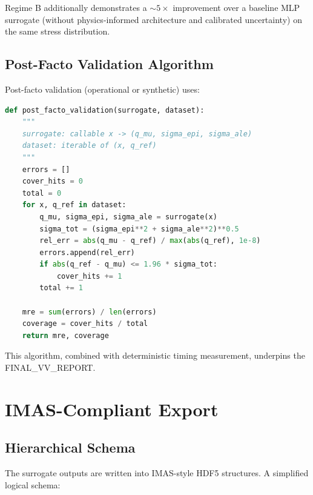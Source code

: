 \documentclass[11pt]{article}
\begin{document}
Regime B additionally demonstrates a $\sim 5\times$ improvement over a baseline MLP surrogate (without physics-informed architecture and calibrated uncertainty) on the same stress distribution.

\subsection{Post-Facto Validation Algorithm}

Post-facto validation (operational or synthetic) uses:

\begin{lstlisting}[style=code,language=Python]
def post_facto_validation(surrogate, dataset):
    """
    surrogate: callable x -> (q_mu, sigma_epi, sigma_ale)
    dataset: iterable of (x, q_ref)
    """
    errors = []
    cover_hits = 0
    total = 0
    for x, q_ref in dataset:
        q_mu, sigma_epi, sigma_ale = surrogate(x)
        sigma_tot = (sigma_epi**2 + sigma_ale**2)**0.5
        rel_err = abs(q_mu - q_ref) / max(abs(q_ref), 1e-8)
        errors.append(rel_err)
        if abs(q_ref - q_mu) <= 1.96 * sigma_tot:
            cover_hits += 1
        total += 1

    mre = sum(errors) / len(errors)
    coverage = cover_hits / total
    return mre, coverage
\end{lstlisting}

This algorithm, combined with deterministic timing measurement, underpins the FINAL\_VV\_REPORT.

\section{IMAS-Compliant Export}

\subsection{Hierarchical Schema}

The surrogate outputs are written into IMAS-style HDF5 structures. A simplified logical schema:
\end{document}
